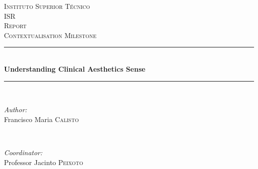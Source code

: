 \begin{titlepage}

\newcommand{\HRule}{\rule{\linewidth}{0.5mm}} %

\center %
 

\textsc{\LARGE Instituto Superior T\'{e}cnico}\\[1.5cm]
\textsc{\Large ISR}\\[0.5cm]
\textsc{\large Report}\\[0.25cm]
\textsc{\small Contextualisation Milestone}\\[0.25cm]


\HRule \\[0.5cm]
{ \large \bfseries Understanding Clinical Aesthetics Sense}\\[0.25cm] %
\HRule \\[0.5cm]
 

\begin{minipage}{0.4\textwidth}
\begin{flushleft} \large
\emph{Author:}\\
Francisco Maria \textsc{Calisto} %
\end{flushleft}
\end{minipage}
~
\begin{minipage}{0.4\textwidth}
\begin{flushright} \large
\emph{Coordinator:} \\
Professor Jacinto \textsc{Peixoto} %
\end{flushright}
\end{minipage}\\[2cm]


\end{titlepage}
